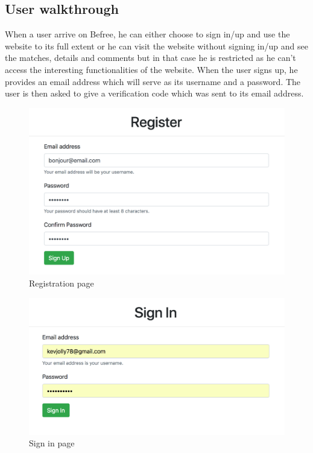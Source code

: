 \documentclass[conference]{IEEEtran}
\begin{document}
\subsection{User walkthrough}
When a user arrive on Befree, he can either choose to sign in/up and use the website to its full extent or he can visit the website without signing in/up and see the matches, details and comments but in that case he is restricted as he can't access the interesting functionalities of the website. When the user signs up, he provides an email address which will serve as its username and a password. The user is then asked to give a verification code which was sent to its email address.

\begin{figure}[htbp]
\centerline{\includegraphics[scale=0.26]{register.png}}
\caption{Registration page}
\end{figure}

\begin{figure}[htbp]
\centerline{\includegraphics[scale=0.26]{signin.png}}
\caption{Sign in page}
\end{figure}
\end{document}
